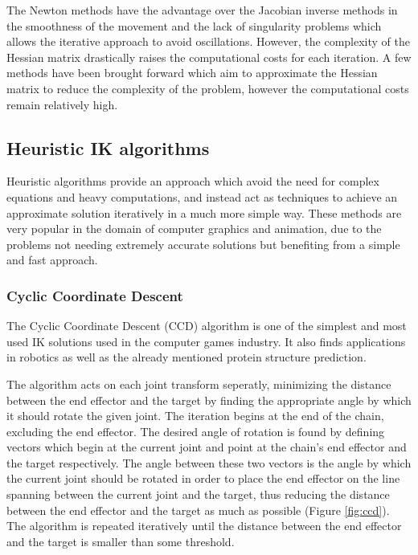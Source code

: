 The Newton methods have the advantage over the Jacobian inverse methods in the
smoothness of the movement and the lack of singularity problems which allows the
iterative approach to avoid oscillations. However, the complexity of the Hessian
matrix drastically raises the computational costs for each iteration. A few
methods have been brought forward which aim to approximate the Hessian matrix
to reduce the complexity of the problem, however the computational costs remain
relatively high.

\subsection{Heuristic IK algorithms}
Heuristic algorithms provide an approach which avoid the need for complex
equations and heavy computations, and instead act as techniques to achieve an
approximate solution iteratively in a much more simple way. These methods are
very popular in the domain of computer graphics and animation, due to the
problems not needing extremely accurate solutions but benefiting from a simple
and fast approach.

\subsubsection{Cyclic Coordinate Descent}
The Cyclic Coordinate Descent (CCD) algorithm is one of the simplest and most
used IK solutions used in the computer games industry. It also finds
applications in robotics as well as the already mentioned protein structure
prediction. 

The algorithm acts on each joint transform seperatly, minimizing the distance
between the end effector and the target by finding the appropriate angle by
which it should rotate the given joint. The iteration begins at the end of the
chain, excluding the end effector. The desired angle of rotation is found by
defining vectors which begin at the current joint and point at the chain's end
effector and the target respectively. The angle between these two vectors is the
angle by which the current joint should be rotated in order to place the end
effector on the line spanning between the current joint and the target, thus
reducing the distance between the end effector and the target as much as
possible (Figure \ref{fig:ccd}). The algorithm is repeated iteratively until the
distance between the end effector and the target is smaller than some threshold.

